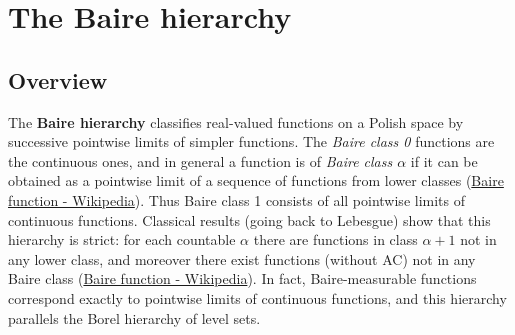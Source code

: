 \documentclass[11pt]{article}
\begin{document}
\section{The Baire hierarchy}
\label{the-baire-hierarchy}
\subsection{Overview}
\label{overview-7}
The \textbf{Baire hierarchy} classifies real-valued functions on a Polish space
by successive pointwise limits of simpler functions. The \emph{Baire class 0}
functions are the continuous ones, and in general a function is of
\emph{Baire class \(\alpha\)} if it can be obtained as a pointwise limit of a
sequence of functions from lower classes
(\href{https://en.wikipedia.org/wiki/Baire\_function\#:\~:text=,Baire\%20class\%20less\%20than\%20\%CE\%B1}{Baire
function - Wikipedia}). Thus Baire class 1 consists of all pointwise
limits of continuous functions. Classical results (going back to
Lebesgue) show that this hierarchy is strict: for each countable
\(\alpha\) there are functions in class \(\alpha+1\) not in any lower
class, and moreover there exist functions (without AC) not in any Baire
class
(\href{https://en.wikipedia.org/wiki/Baire\_function\#:\~:text=Baire\%20class\%20of\%20a\%20countable,not\%20in\%20any\%20Baire\%20class}{Baire
function - Wikipedia}). In fact, Baire-measurable functions correspond
exactly to pointwise limits of continuous functions, and this hierarchy
parallels the Borel hierarchy of level sets.
\end{document}
